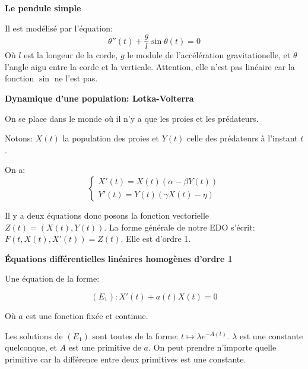 \documentclass{article}
\begin{document}
\begin{tcolorbox}[colback=cyan!5!white,colframe=cyan!75!black,title=Exemple 1.3]

\textbf{Le pendule simple}

Il est modélisé par l'équation:  
\[
\theta ''(t) + \frac{g}{l} \sin{\theta {(t)}} = 0
\]
Où $l$ est la longeur de la corde, $g$ le module de l'accélération gravitationelle, et $\theta$ l'angle aigu entre la corde et la verticale. Attention, elle n'est pas linéaire car la fonction $\sin$ ne l'est pas.

\end{tcolorbox}

\begin{tcolorbox}[colback=cyan!5!white,colframe=cyan!75!black,title=Exemple 1.4]

\textbf{Dynamique d'une population: Lotka-Volterra}

On se place dans le monde où il n'y a que les proies et les prédateurs.

Notons: $X(t)$ la population des proies et $Y(t)$ celle des prédateurs à l'instant $t$.

On a:
\[
\begin{cases} 
X'(t) = X(t)(\alpha - \beta Y(t))\\
Y'(t) = Y(t)(\gamma X(t) - \eta)
\end{cases}
\]

Il y a deux équations donc posons la fonction vectorielle $Z(t) = (X(t), Y(t))$. La forme générale de notre EDO s'écrit: $F(t, X(t), X'(t)) = Z(t)$. Elle est d'ordre 1.

\end{tcolorbox}



\begin{tcolorbox}[colback=gray!5!white,colframe=gray!75!black,title=Rappel 1.1]

\textbf{Équations différentielles linéaires homogènes d'ordre 1}

Une équation de la forme:

\[
(E_{1}) : X'(t) + a(t)X(t) = 0 
\] 

Où $a$ est une fonction fixée et continue.


\end{tcolorbox}

\begin{tcolorbox}[colback=red!5!white,colframe=red!75!black,title=Théorème 1.1]

Les solutions de $(E_{1})$ sont toutes de la forme: $t \mapsto \lambda e^{-A(t)}$. $\lambda$ est une constante quelconque, et $A$ est une primitive de $a$.
\tcblower
On peut prendre n'importe quelle primitive car la différence entre deux primitives est une constante.

\end{tcolorbox}
\end{document}
